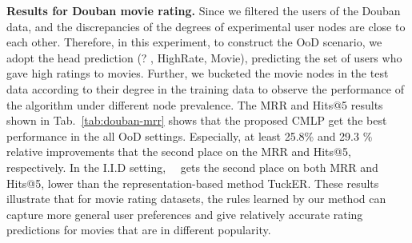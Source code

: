 \noindent
\textbf{Results for Douban movie rating.}
Since we filtered the users of the Douban data, and the discrepancies of the degrees of experimental user nodes are close to each other.
Therefore, in this experiment, to construct the OoD scenario, we adopt the head prediction (? , HighRate, Movie), predicting the set of users who gave high ratings to movies.
Further, we bucketed the movie nodes in the test data according to their degree in the training data to observe the performance of the algorithm under different node prevalence.
The MRR and Hits@5 results shown in
Tab.~\ref{tab:douban-mrr} shows that the proposed CMLP get the best performance in the all OoD settings.
Especially, at least 25.8\% and 29.3 \% relative improvements that the second place on the MRR and Hits@5, respectively.
In the I.I.D setting, ~\dname~gets the second place on both MRR and Hits@5, lower than the representation-based method TuckER.
These results illustrate that for movie
rating datasets, the rules learned by our method can capture more general user preferences and give relatively accurate rating predictions for movies that are in different popularity.





